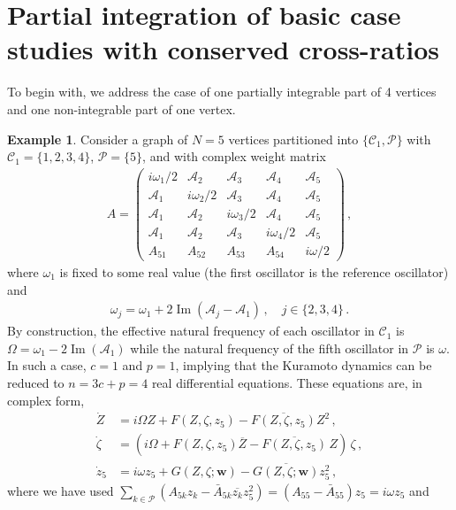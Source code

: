 \documentclass[aps,pre,reprint,longbibliography,superscriptaddress,noshowpacs,floatfix]{revtex4-2}
\theoremstyle{definition}
\newtheorem{example}[theorem]{Example}
\theoremstyle{remark}
\DeclareMathOperator{\Imag}{Im}
\begin{document}
\section{Partial integration of basic case studies with conserved cross-ratios}
\label{subsec:basic_cases}
To begin with, we address the case of one partially integrable part of 4 vertices and one non-integrable part of one vertex.
\begin{example}
    Consider a graph of $N= 5$ vertices partitioned into $\{\mathcal{C}_1, \mathcal{P}\}$ with $\mathcal{C}_1 = \{1,2,3,4\}$, $\mathcal{P} = \{5\}$, and with complex weight matrix 
    \begin{align*}
    A = \begin{pmatrix}
        i\omega_1/2 & \mathcal{A}_2 & \mathcal{A}_3 & \mathcal{A}_4 & \mathcal{A}_5\\
        \mathcal{A}_1 & i\omega_2 /2 & \mathcal{A}_3 & \mathcal{A}_4 & \mathcal{A}_5\\
        \mathcal{A}_1 & \mathcal{A}_2 & i\omega_3/2 & \mathcal{A}_4 & \mathcal{A}_5\\
        \mathcal{A}_1 & \mathcal{A}_2 & \mathcal{A}_3 & i\omega_4/2 & \mathcal{A}_5\\
        A_{51} & A_{52} & A_{53} & A_{54} & i\omega/2
    \end{pmatrix}\,,
\end{align*}
where $\omega_1$ is fixed to some real value (the first oscillator is the reference oscillator)  and 
\begin{align*}
    \omega_j = \omega_1 + 2\Imag(\mathcal{A}_j - \mathcal{A}_1)\,,\quad j\in \{2,3,4\}\,.
\end{align*}
By construction, the effective natural frequency of each oscillator in $\mathcal{C}_1$ is $\Omega = \omega_1 - 2\Imag(\mathcal{A}_1)$ while the natural frequency of the fifth oscillator in $\mathcal{P}$ is $\omega$. In such a case, $c=1$ and $p = 1$, implying that the Kuramoto dynamics can be reduced to $n = 3c + p = 4$ real differential equations.
These equations are, in complex form,
\begin{align*}  
    \dot{Z} &= i\Omega Z + F(Z, \zeta, z_5) - \overline{F(Z, \zeta, z_5)}Z^2\,,\\
    \dot{\zeta} &= (i\Omega + F(Z, \zeta, z_5)\overline{Z} - \overline{F(Z, \zeta, z_5)}\,Z)\,\zeta\,,\\
    \dot{z}_5 &= i\omega z_5 + G(Z, \zeta;\bm{w}) - \overline{G(Z, \zeta;\bm{w})}z_5^2\,,
\end{align*}
where we have used $\sum_{k\in \mathcal{P}} (A_{5 k}z_k - \bar{A}_{5 k}\overline{z_k}z_5^2) = (A_{55} - \bar{A}_{55})z_5 = i\omega z_5$ and

\end{example}
\end{document}
